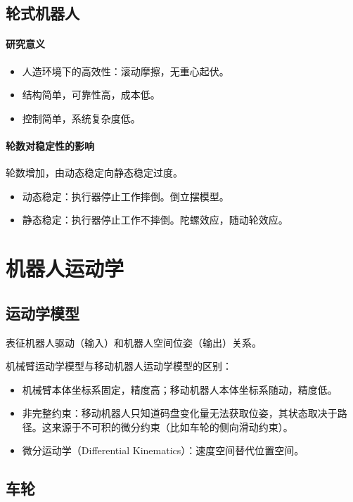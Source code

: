 \documentclass[
12pt, %
a4paper, 
oneside, %
headinclude,footinclude, %
]{scrartcl}
\begin{document}
\subsection{轮式机器人}
\paragraph{研究意义}
\begin{itemize}
\item 人造环境下的高效性：滚动摩擦，无重心起伏。
\item 结构简单，可靠性高，成本低。
\item 控制简单，系统复杂度低。
\end{itemize}
\paragraph{轮数对稳定性的影响}
轮数增加，由动态稳定向静态稳定过度。
\begin{itemize}
\item 动态稳定：执行器停止工作摔倒。倒立摆模型。    
\item 静态稳定：执行器停止工作不摔倒。陀螺效应，随动轮效应。
\end{itemize}
\section{机器人运动学}
\subsection{运动学模型}
表征机器人驱动（输入）和机器人空间位姿（输出）关系。

机械臂运动学模型与移动机器人运动学模型的区别：
\begin{itemize}
\item 机械臂本体坐标系固定，精度高；移动机器人本体坐标系随动，精度低。
\item 非完整约束：移动机器人只知道码盘变化量无法获取位姿，其状态取决于路径。这来源于不可积的微分约束（比如车轮的侧向滑动约束）。
\item 微分运动学（Differential Kinematics）：速度空间替代位置空间。
\end{itemize}
\subsection{车轮}
\end{document}
